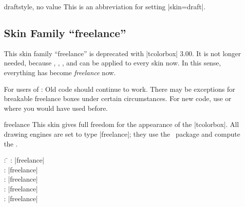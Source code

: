 \begin{docTcbKey}{draft}{}{style, no value}
  This is an abbreviation for setting |skin=draft|.
\end{docTcbKey}


\begin{dispExample}
\end{dispExample}



\begin{dispExample}
\vspace*{3mm}
\begin{tcolorbox}[draft,title=A colored box with the \enquote{draft} skin]
\lipsum[1-3]
\tcblower
\lipsum[4-6]
\end{tcolorbox}
\end{dispExample}



\clearpage
\subsection{Skin Family \enquote{freelance}}
\begin{marker}
This skin family \enquote{freelance} is deprecated with |tcolorbox| 3.00.
It is not longer needed, because
,
,
, and
can be applied to every skin now. In this sense, everything has become
\emph{freelance} now.\par
For users of : Old code should continue to work. There may be
exceptions for breakable freelance boxes under certain circumstances.
For new code, use  or  where
you would have used  before.
\end{marker}

\begin{docSkin}{freelance}
  This skin gives full freedom for the appearance of the |tcolorbox|.
  All drawing engines are set to type |freelance|; they use the \tikzname\ package
  and compute the .
\begin{tcolorbox}[skintable=freelance]
  \begin{tabbing}
    : \=\kill
    :           \> |freelance|\\
    : \> |freelance|\\ 
    :        \> |freelance|\\
    :    \> |freelance|\\
    :           \> |freelance|
  \end{tabbing}
\end{tcolorbox}
\end{docSkin}

